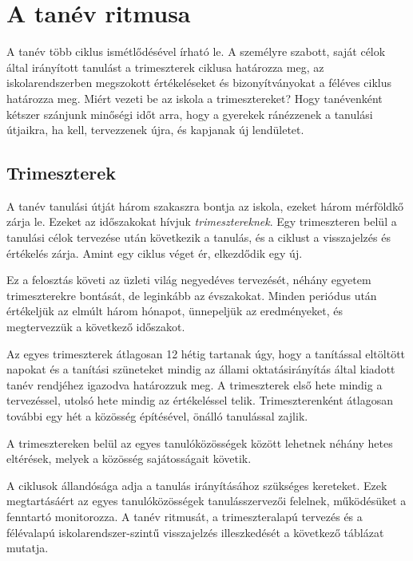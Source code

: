 \hypertarget{a-tanev-ritmusa}{%
\section{A tanév ritmusa}\label{a-tanev-ritmusa}}

A tanév több ciklus ismétlődésével írható le. A személyre szabott, saját
célok által irányított tanulást a trimeszterek ciklusa határozza meg, az
iskolarendszerben megszokott értékeléseket és bizonyítványokat a féléves
ciklus határozza meg. Miért vezeti be az iskola a trimesztereket? Hogy
tanévenként kétszer szánjunk minőségi időt arra, hogy a gyerekek
ránézzenek a tanulási útjaikra, ha kell, tervezzenek újra, és kapjanak új lendületet.


\hypertarget{trimeszterek}{%
\subsection{Trimeszterek}\label{trimeszterek}}

A tanév tanulási útját három szakaszra bontja az iskola, ezeket három
mérföldkő zárja le. Ezeket az időszakokat hívjuk \emph{trimesztereknek}.
Egy trimeszteren belül a tanulási célok tervezése után következik a
tanulás, és a ciklust a visszajelzés és értékelés zárja. Amint egy
ciklus véget ér, elkezdődik egy új.

Ez a felosztás követi az üzleti világ negyedéves tervezését, néhány
egyetem trimeszterekre bontását, de leginkább az évszakokat. Minden
periódus után értékeljük az elmúlt három hónapot, ünnepeljük az
eredményeket, és megtervezzük a következő időszakot.

Az egyes trimeszterek átlagosan 12 hétig tartanak úgy, hogy a tanítással
eltöltött napokat és a tanítási szüneteket mindig az állami oktatásirányítás
által kiadott tanév rendjéhez igazodva határozzuk meg. A trimeszterek
első hete mindig a tervezéssel, utolsó hete mindig az értékeléssel
telik. Trimeszterenként átlagosan további egy hét a közösség építésével,
önálló tanulással zajlik.

A trimesztereken belül az egyes tanulóközösségek között lehetnek néhány
hetes eltérések, melyek a közösség sajátosságait követik.

A ciklusok állandósága adja a tanulás irányításához szükséges kereteket.
Ezek megtartásáért az egyes tanulóközösségek tanulásszervezői felelnek,
működésüket a fenntartó monitorozza. A tanév ritmusát, a
trimeszteralapú tervezés és a félévalapú iskolarendszer-szintű
visszajelzés illeszkedését a következő táblázat mutatja.

